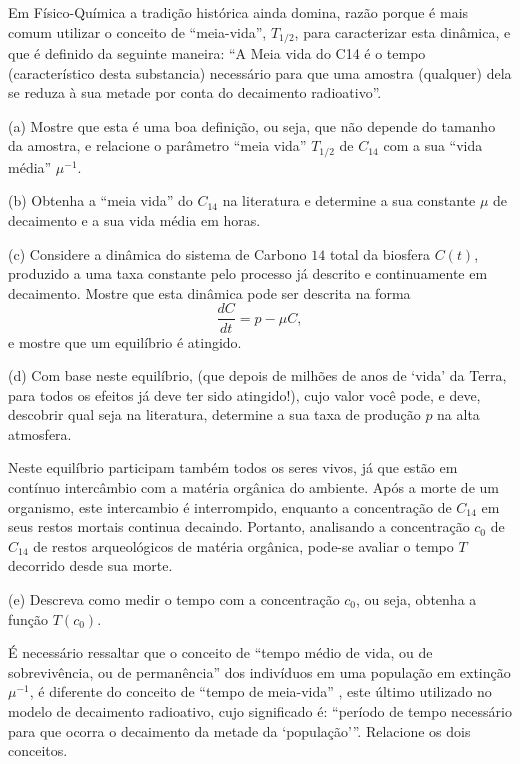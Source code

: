     \begin{exercise}
    Em Físico-Química a tradição histórica ainda domina, razão porque é mais comum utilizar o conceito de ``meia-vida'', \(T_{1/2}\), para caracterizar esta dinâmica, e que é definido da seguinte maneira: ``A Meia vida do C14 é o tempo (característico desta substancia) necessário para que uma amostra (qualquer) dela se reduza à sua metade por conta do decaimento radioativo''. 
    
    \begin{description}
    \item (a) Mostre que esta é uma boa definição, ou seja, que não depende do tamanho da amostra, e relacione o parâmetro ``meia vida'' \(T_{1/2}\) de \(C_{14}\) com a sua ``vida média'' \(\mu^{-1}\).

    \item (b) Obtenha a ``meia vida'' do \(C_{14}\) na literatura e determine a sua constante \(\mu\) de decaimento e a sua vida média em horas.
    
    \item (c) Considere a dinâmica do sistema de Carbono \(14\) total da biosfera \(C(t)\), produzido a uma taxa constante pelo processo já descrito e continuamente em decaimento. Mostre que esta dinâmica pode ser descrita na forma
    \[\dfrac{dC}{dt} = p - \mu C,\]
    e mostre que um equilíbrio é atingido.
    
    \item (d) Com base neste equilíbrio, (que depois de milhões de anos de `vida' da Terra, para todos os efeitos já deve ter sido atingido!), cujo valor você pode, e deve, descobrir qual seja na literatura, determine a sua taxa de produção \(p\) na alta atmosfera.
    
    Neste equilíbrio participam também todos os seres vivos, já que estão em contínuo intercâmbio com a matéria orgânica do ambiente. Após a morte de um organismo, este intercambio é interrompido, enquanto a concentração de \(C_{14}\) em seus restos mortais continua decaindo. Portanto, analisando a concentração \(c_0\) de \(C_{14}\) de restos arqueológicos de matéria orgânica, pode-se avaliar o tempo \(T\) decorrido desde sua morte. 

    \item (e) Descreva como medir o tempo com a concentração \(c_0\), ou seja, obtenha a função \(T(c_0)\).
    
    É necessário ressaltar que o conceito de ``tempo médio de vida, ou de sobrevivência, ou de permanência'' dos indivíduos em uma população em extinção \(\mu^{-1}\), é diferente do conceito de ``tempo de meia-vida'' , este último utilizado no modelo de decaimento radioativo, cujo significado é: ``período de tempo necessário para que ocorra o decaimento da metade da `população'''. Relacione os dois conceitos.
    \end{description}
    \end{exercise}
 
